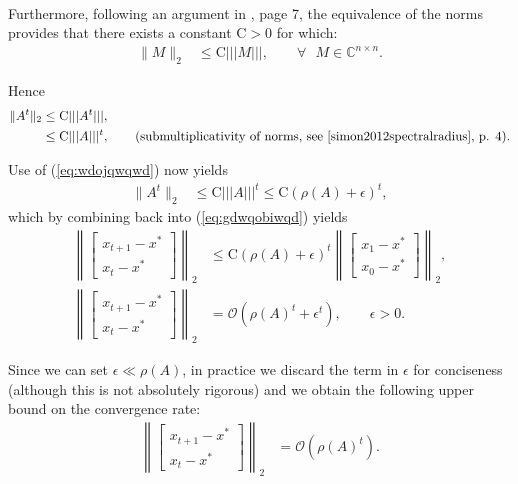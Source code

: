 \documentclass{article}
\begin{document}
\\
\par Furthermore, following an argument in \cite{simon2012spectralradius}, page 7, the equivalence of the norms provides that there exists a constant $\text{C}>0$ for which:
\begin{align}
	\| M \|_2 &\le \text{C} ||| M |||, \qquad \forall \text{ }M \in \mathds{C}^{n\times n}. \nonumber
\end{align}
\par Hence
\begin{align}
	\| A^t \|_2	&\le \text{C} ||| A^t |||, \nonumber \\
			&\le \text{C} ||| A |||^t, \qquad \text{(submultiplicativity of norms, see \cite{simon2012spectralradius}, p. 4)}.\nonumber
\end{align}
\par Use of (\ref{eq:wdojqwqwd}) now yields
\begin{align}
	\label{eq:pefnponweffe}
	\| A^t \|_2 &\le \text{C} ||| A |||^t \le \text{C} \left( \rho\left(A\right) + \epsilon \right)^t, \nonumber
\end{align}
which by combining back into (\ref{eq:gdwqobiwqd}) yields
\begin{align}
\left\lVert  \begin{bmatrix}x_{t+1} - x^*\\x_{t} - x^*\end{bmatrix}  \right\rVert_2 &\leq \text{C} \left( \rho\left(A\right) + \epsilon \right)^t  \left\lVert \begin{bmatrix}x_{1}- x^*\\x_{0} - x^*\end{bmatrix}  \right\rVert_2, \nonumber\\
\left\lVert  \begin{bmatrix}x_{t+1} - x^*\\x_{t} - x^*\end{bmatrix}  \right\rVert_2 &= \mathcal{O} \left( \rho\left(A\right)^t + \epsilon^t \right), \qquad \epsilon >0. \nonumber
\end{align}

Since we can set $\epsilon \ll \rho\left( A \right)$, in practice we discard the term in $\epsilon$ for conciseness (although this is not absolutely rigorous) and we obtain the following upper bound on the convergence rate:
\begin{align}
\left\lVert  \begin{bmatrix}x_{t+1} - x^*\\x_{t} - x^*\end{bmatrix}  \right\rVert_2 &= \mathcal{O}  \left( \rho\left(A\right)^t \right). \nonumber
\end{align}
\end{document}
